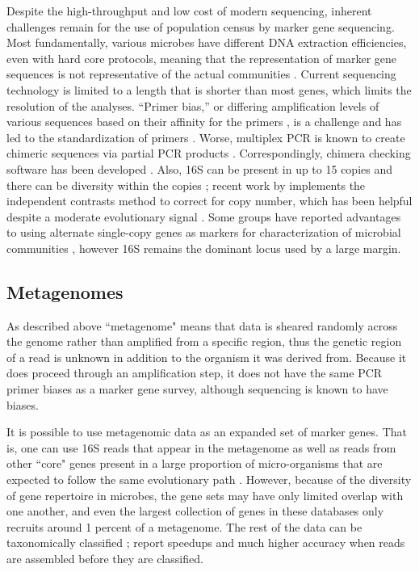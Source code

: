 \documentclass{amsart}
\begin{document}
Despite the high-throughput and low cost of modern sequencing, inherent challenges remain for the use of population census by marker gene sequencing.
Most fundamentally, various microbes have different DNA extraction efficiencies, even with hard core protocols, meaning that the representation of marker gene sequences is not representative of the actual communities \citep{morgan2010metagenomic}.
Current sequencing technology is limited to a length that is shorter than most genes, which limits the resolution of the analyses.
``Primer bias,'' or differing amplification levels of various sequences based on their affinity for the primers \citep{suzuki1996bias,polz1998bias}, is a challenge and has led to the standardization of primers \citep{methe2012framework}.
Worse, multiplex PCR is known to create chimeric sequences via partial PCR products \citep{hugenholtz2003chimeric,ashelford2005least,haas2011chimeric,schloss2011reducing}.
Correspondingly, chimera checking software has been developed \citep[including][]{ashelford2006new,edgar2011uchime}.
Also, 16S can be present in up to 15 copies and there can be diversity within the copies \citep{klappenbach2001rrndb};
recent work by \citet{kembel2012incorporating} implements the independent contrasts \citep{felsenstein1985phylogenies} method to correct for copy number, which has been helpful despite a moderate evolutionary signal \citep{klappenbach2000rrna}.
Some groups have reported advantages to using alternate single-copy genes as markers for characterization of microbial communities \citep[e.g.][]{case2007rpob,mcnabb2004hsp65}, however 16S remains the dominant locus used by a large margin.

\subsection{Metagenomes}
As described above ``metagenome" means that data is sheared randomly across the genome rather than amplified from a specific region, thus the genetic region of a read is unknown in addition to the organism it was derived from.
Because it does proceed through an amplification step, it does not have the same PCR primer biases as a marker gene survey, although sequencing is known to have biases.

It is possible to use metagenomic data as an expanded set of marker genes.
That is, one can use 16S reads that appear in the metagenome as well as reads from other ``core" genes present in a large proportion of micro-organisms that are expected to follow the same evolutionary path \citep{von2007quantitative,wu2008amphora,stark2010mltreemap,kembel2011phylogenetic}.
However, because of the diversity of gene repertoire in microbes, the gene sets may have only limited overlap with one another, and even the largest collection of genes in these databases only recruits around 1 percent of a metagenome.
The rest of the data can be taxonomically classified
\citep[methods reviewed by][]{mande2012classification}; \citet{treangen2013metamos} report speedups and much higher accuracy when reads are assembled before they are classified.
\end{document}
